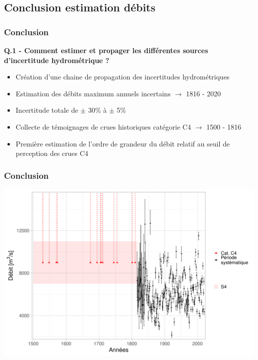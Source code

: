 \documentclass[compress,9pt]{beamer}
\begin{document}
	\subsection{Conclusion estimation débits}
	\begin{frame}[t]
		\frametitle{Conclusion}
		\vfill
		\centering
		\large{\textbf{Q.1 - Comment estimer et propager les différentes sources d'incertitude
hydrométrique ?}}
		\vfill
		\normalsize
		\begin{itemize}
			\item<1->[$\vartriangleright$] Création d'une chaine de propagation des incertitudes hydrométriques
			\vspace{10pt}
			\item<2->[$\vartriangleright$] Estimation des débits maximum annuels incertains $\rightarrow$ 1816 - 2020
			\vspace{10pt}
			\item<3->[$\vartriangleright$] Incertitude totale de $\pm$ 30\% à $\pm$ 5\% 
			\vspace{10pt}
			\item<4->[$\vartriangleright$] Collecte de témoignages de crues historiques catégorie C4 $\rightarrow$ 1500 - 1816
			\vspace{10pt}
			\item<5->[$\vartriangleright$] Première estimation de l'ordre de grandeur du débit relatif au seuil de perception des crues C4
		\end{itemize}
	\end{frame}
	
	\begin{frame}
		\frametitle{Conclusion}
		\vfill
		\centering
		\includegraphics[width = .9\textwidth]{./Figures/EchMixteC4Bcr.pdf} 
	\end{frame}
\end{document}
